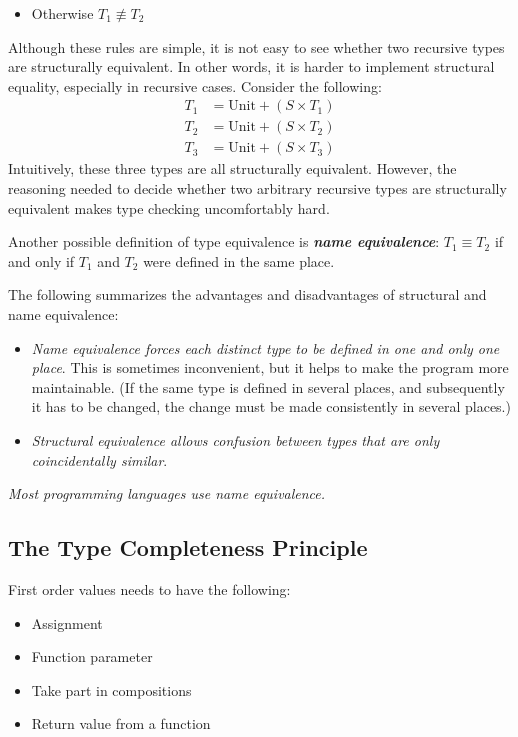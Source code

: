 \documentclass{article}
\begin{document}
\begin{itemize}
    \item Otherwise $T_1 \not\equiv T_2$
\end{itemize}

Although these rules are simple, it is not easy to see whether two recursive
types are structurally equivalent. In other words, it is harder to implement structural equality, especially in recursive cases. Consider the following:
\begin{align*}
    T_1 &= \text{Unit} + (S \times T_1)\\
    T_2 &= \text{Unit} + (S \times T_2)\\
    T_3 &= \text{Unit} + (S \times T_3)
\end{align*}
Intuitively, these three types are all structurally equivalent. However, the reasoning needed to decide whether two arbitrary recursive types are structurally equivalent makes type checking uncomfortably hard.

Another possible definition of type equivalence is \textbf{\textit{name equivalence}}: $T_1 \equiv T_2$ if and only if $T_1$ and $T_2$ were defined in the same place.

The following summarizes the advantages and disadvantages of structural and
name equivalence:
\begin{itemize}
    \item \textit{Name equivalence forces each distinct type to be defined in one and only one place}. This is sometimes inconvenient, but it helps to make the program more maintainable. (If the same type is defined in several places, and subsequently it has to be changed, the change must be made consistently in several places.)
    \item \textit{Structural equivalence allows confusion between types that are only coincidentally similar}.
\end{itemize}

\textit{Most programming languages use name equivalence.}

\subsection{The Type Completeness Principle}

First order values needs to have the following:
\begin{itemize}
    \item Assignment
    \item Function parameter
    \item Take part in compositions
    \item Return value from a function
\end{itemize}
\end{document}
